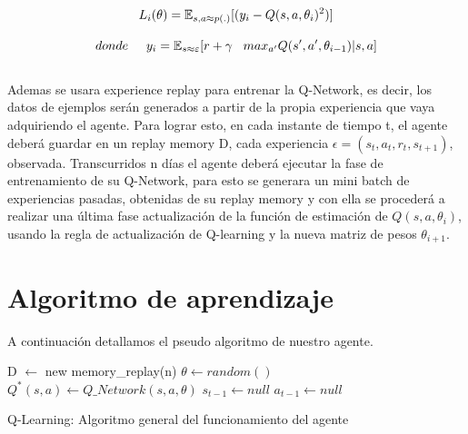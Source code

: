 \begin{equation}
L_i(\theta) = \operatorname{\mathbb{E}}_{s, a \approx p(.)}[(y_i - Q(s, a, \theta_i)^2)]
\\\\ 
\end{equation}

\begin{equation}
donde \hspace*{0.5cm}  y_i =  \operatorname{\mathbb{E}}_{s \approx \varepsilon}[r + \gamma  \hspace*{0.3cm}  max_{a'} Q(s', a', \theta_{i-1}) | s, a]
\end{equation}
\\

Ademas se usara experience replay para entrenar la Q-Network, es decir, los datos de ejemplos serán generados a partir de la propia experiencia que vaya adquiriendo el agente. Para lograr esto, en cada instante de tiempo t, el agente deberá guardar en un replay memory D, cada experiencia $\epsilon = (s_t, a_t, r_t, s_{t+1})$, observada.
Transcurridos n días el agente deberá ejecutar la fase de entrenamiento de su Q-Network, para esto se generara un mini batch de experiencias pasadas, obtenidas de  su replay memory y con ella se procederá a realizar una última fase actualización de la función de estimación de $Q(s, a, \theta_i)$, usando la regla de actualización de Q-learning y la nueva matriz de pesos $\theta_{i+1}$.
\clearpage
\section{Algoritmo de aprendizaje}
A continuación detallamos el pseudo algoritmo de nuestro agente.
\begin{algorithm}
	 D $\gets$ new memory\_replay(n)\;	
     $\theta \gets random() $\;
     $Q^*(s, a) \gets Q\_Network(s, a, \theta)$\;
     $s_{t-1} \gets null$ \;
     $a_{t-1} \gets null$ \;
	\caption{Q-Learning: Algoritmo general del funcionamiento del agente}
\end{algorithm}
